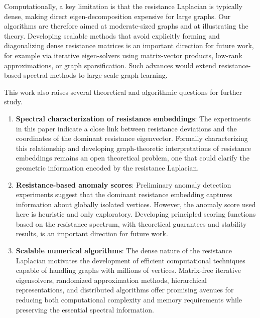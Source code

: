 \documentclass[12pt,a4paper]{amsart}
\theoremstyle{remark}
\theoremstyle{definition}
\newcommand{\1}{\mathbf{1}}
\newcommand{\0}{\mathbf{0}}
\begin{document}
Computationally, a key limitation is that the resistance Laplacian is typically dense, making direct eigen-decomposition expensive for large graphs. Our algorithms are therefore aimed at moderate-sized graphs and at illustrating the theory. Developing scalable methods that avoid explicitly forming and diagonalizing dense resistance matrices is an important direction for future work, for example via iterative eigen-solvers using matrix-vector products, low-rank approximations, or graph sparsification. Such advances would extend resistance-based spectral methods to large-scale graph learning.

This work also raises several theoretical and algorithmic questions for further study.

\begin{enumerate}
    \item \textbf{Spectral characterization of resistance embeddings}: The experiments in this paper indicate a close link between resistance deviations and the coordinates of the dominant resistance eigenvector. Formally characterizing this relationship and developing graph-theoretic interpretations of resistance embeddings remains an open theoretical problem, one that could clarify the geometric information encoded by the resistance Laplacian.
    \item \textbf{Resistance-based anomaly scores}: Preliminary anomaly detection experiments suggest that the dominant resistance embedding captures information about globally isolated vertices. However, the anomaly score used here is heuristic and only exploratory. Developing principled scoring functions based on the resistance spectrum, with theoretical guarantees and stability results, is an important direction for future work.
    \item \textbf{Scalable numerical algorithms}: The dense nature of the resistance Laplacian motivates the development of efficient computational techniques capable of handling graphs with millions of vertices. Matrix-free iterative eigensolvers, randomized approximation methods, hierarchical representations, and distributed algorithms offer promising avenues for reducing both computational complexity and memory requirements while preserving the essential spectral information.

\end{enumerate}
\end{document}
